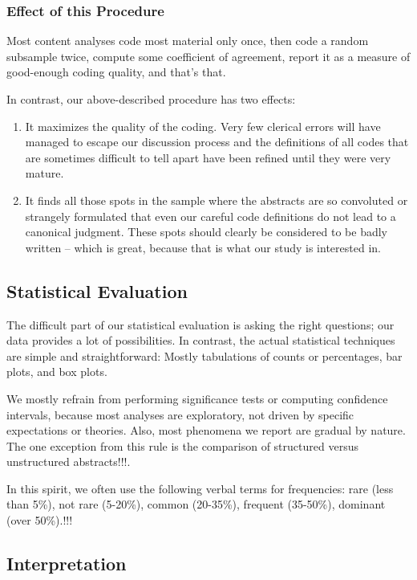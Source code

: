 \documentclass[10pt,journal,compsoc]{IEEEtran}
\begin{document}
\subsubsection{Effect of this Procedure}

Most content analyses code most material only once, 
then code a random subsample twice, 
compute some coefficient of agreement, 
report it as a measure of good-enough coding quality,
and that's that.

In contrast, our above-described procedure has two effects:
\begin{enumerate}
	\item It maximizes the quality of the coding.
	  Very few clerical errors will have managed to escape our discussion process
	  and the definitions of all codes that are sometimes difficult to tell apart
	  have been refined until they were very mature.
	\item It finds all those spots in the sample where the abstracts are so convoluted
	  or strangely formulated that even our careful code definitions do not lead
	  to a canonical judgment.
	  These spots should clearly be considered to be badly written -- which is great,
	  because that is what our study is interested in.
\end{enumerate}


\subsection{Statistical Evaluation}

The difficult part of our statistical evaluation is asking the right questions;
our data provides a lot of possibilities.
In contrast, the actual statistical techniques are simple and straightforward:
Mostly tabulations of counts or percentages, bar plots, and box plots.

We mostly refrain from performing significance tests or computing confidence intervals,
because most analyses are exploratory, not driven by specific expectations or theories.
Also, most phenomena we report are gradual by nature.
The one exception from this rule is the comparison of 
structured versus unstructured abstracts!!!.

In this spirit, we often use the following verbal terms for frequencies: 
rare (less than 5\%),
not rare (5-20\%),
common (20-35\%),
frequent (35-50\%),
dominant (over 50\%).!!!


\subsection{Interpretation}
\end{document}
